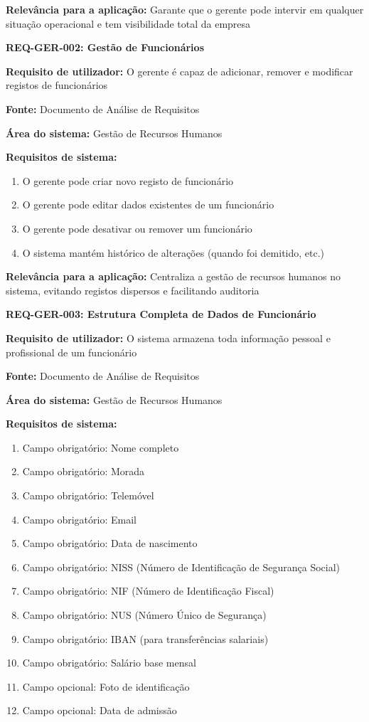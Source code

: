 \documentclass[11pt,a4paper]{article}
\newcommand{\reqheader}[1]{{\noindent\large\bfseries\color{sectionblue}#1}\par\vspace{0.3cm}}
\newcommand{\reqfield}[2]{{\noindent\textbf{#1:} #2}\par\vspace{0.2cm}}
\begin{document}
\reqfield{Relevância para a aplicação}{Garante que o gerente pode intervir em qualquer situação operacional e tem visibilidade total da empresa}

\vspace{0.8cm}

\reqheader{REQ-GER-002: Gestão de Funcionários}

\reqfield{Requisito de utilizador}{O gerente é capaz de adicionar, remover e modificar registos de funcionários}

\reqfield{Fonte}{Documento de Análise de Requisitos}

\reqfield{Área do sistema}{Gestão de Recursos Humanos}

\reqfield{Requisitos de sistema}{
	\begin{enumerate}
		\item O gerente pode criar novo registo de funcionário
		\item O gerente pode editar dados existentes de um funcionário
		\item O gerente pode desativar ou remover um funcionário
		\item O sistema mantém histórico de alterações (quando foi demitido, etc.)
	\end{enumerate}
}

\reqfield{Relevância para a aplicação}{Centraliza a gestão de recursos humanos no sistema, evitando registos dispersos e facilitando auditoria}

\vspace{0.8cm}

\reqheader{REQ-GER-003: Estrutura Completa de Dados de Funcionário}

\reqfield{Requisito de utilizador}{O sistema armazena toda informação pessoal e profissional de um funcionário}

\reqfield{Fonte}{Documento de Análise de Requisitos}

\reqfield{Área do sistema}{Gestão de Recursos Humanos}

\reqfield{Requisitos de sistema}{
	\begin{enumerate}
		\item Campo obrigatório: Nome completo
		\item Campo obrigatório: Morada
		\item Campo obrigatório: Telemóvel
		\item Campo obrigatório: Email
		\item Campo obrigatório: Data de nascimento
		\item Campo obrigatório: NISS (Número de Identificação de Segurança Social)
		\item Campo obrigatório: NIF (Número de Identificação Fiscal)
		\item Campo obrigatório: NUS (Número Único de Segurança)
		\item Campo obrigatório: IBAN (para transferências salariais)
		\item Campo obrigatório: Salário base mensal
		\item Campo opcional: Foto de identificação
		\item Campo opcional: Data de admissão
	\end{enumerate}
}
\end{document}
